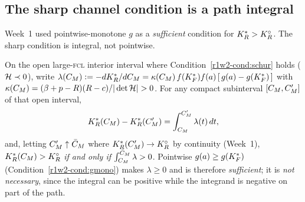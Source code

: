 \subsection{The sharp channel condition is a path integral}

Week~1 used pointwise-monotone $g$ as a \emph{sufficient} condition for
$K_R^{*}>K_R^{\circ}$. The sharp condition is integral, not pointwise.

\begin{theorem}\label{r1w2-thm:sharp}
On the open large-\textsc{fcl} interior interval where Condition~\ref{r1w2-cond:schur}
holds ($\mathcal H\prec0$), write
$\lambda(C_M)\vcentcolon=-dK_R^{*}/dC_M=\kappa(C_M)\,f(K_F^{*})f(a)\,[\,g(a)-g(K_F^{*})\,]$ with
$\kappa(\CM)=(\bp-R)(R-c)/|\det\Hcal|>0$. For any compact subinterval
$[C_M,C_M']$ of that open interval,
\begin{equation}\label{r1w2-eq:ftc}
  K_R^{*}(C_M)-K_R^{*}(C_M')=\int_{C_M}^{C_M'}\lambda(t)\,dt ,
\end{equation}
and, letting $C_M'\uparrow\bar C_M$ where $K_R^{*}(C_M')\to K_R^{\circ}$ by continuity (Week~1),
$K_R^{*}(C_M)>K_R^{\circ}$ \emph{if and only if} $\int_{C_M}^{\bar C_M}\lambda>0$.
Pointwise $g(a)\ge g(K_F^{*})$ (Condition~\ref{r1w2-cond:gmono}) makes $\lambda\ge0$ and is
therefore \emph{sufficient}; it is \emph{not necessary}, since the integral can be
positive while the integrand is negative on part of the path.
\end{theorem}

